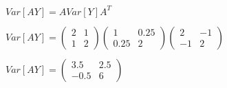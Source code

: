 \documentclass{exam}
\begin{document}
\begin{equation}
\begin{gathered}
Var[AY] = AVar[Y]A^T\\
\\
Var[AY] = \begin{pmatrix} 2 & 1 \\ 1 & 2 \end{pmatrix}\begin{pmatrix} 1 & 0.25 \\ 0.25 & 2 \end{pmatrix}\begin{pmatrix} 2 & -1 \\ -1 & 2 \end{pmatrix}\\
\\
Var[AY] = \begin{pmatrix} 3.5 & 2.5 \\ -0.5 & 6 \end{pmatrix}
\end{gathered}
\end{equation}
\end{document}
